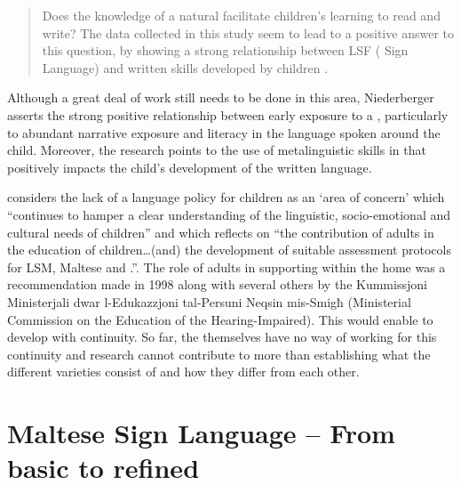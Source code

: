\documentclass[output=paper]{langsci/langscibook}
\begin{document}
\begin{quote}
Does the knowledge of a natural  facilitate 
children’s learning to read and write? The data collected in this
study seem to lead to a positive answer to this question, by showing a
strong relationship between LSF ( Sign Language) and written
 skills developed by  
children \citep[45]{n08}.
\end{quote}

Although a great deal of work still needs to be done in this area,
Niederberger asserts the strong positive relationship between early
exposure to a , particularly to abundant narrative
exposure and literacy in the language spoken around the  child.
Moreover, the research points to the use of metalinguistic skills in
 that positively impacts the child’s development of the
written language.

\citet[43]{p07} considers the lack of a language policy for 
children as an `area of concern' which ``continues to hamper a clear
understanding of the linguistic, socio-emotional and cultural needs of
 children'' and which reflects on ``the contribution of  adults
in the education of  children{\dots}(and) the development of suitable
assessment protocols for LSM, Maltese and .''. The
role of  adults in supporting  within the home was a
recommendation made in 1998 along with several others by the
Kummissjoni Ministerjali dwar l-Edukazzjoni tal-Persuni Neqsin
mis-Smigħ (Ministerial Commission on the Education of the Hearing-Impaired).  This would enable  to develop with
continuity.  So far, the  themselves have no way of working for
this continuity and research cannot contribute to more than
establishing what the different varieties consist of and how they
differ from each other.

\section{Maltese Sign Language – From basic to refined}
\end{document}
